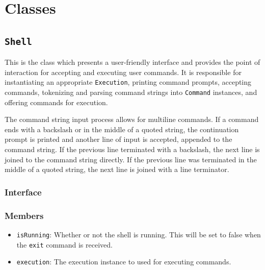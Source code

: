 \documentclass{article}
\begin{document}
  \section{Classes}

  \subsection{\texttt{Shell}}

  This is the class which presents a user-friendly interface and
  provides the point of interaction for accepting and executing user
  commands.  It is responsible for instantiating an appropriate
  \texttt{Execution}, printing command prompts, accepting commands,
  tokenizing and parsing command strings into \texttt{Command}
  instances, and offering commands for execution.

  The command string input process allows for multiline commands.  If a
  command ends with a backslash or in the middle of a quoted string, the
  continuation prompt is printed and another line of input is accepted,
  appended to the command string.  If the previous line terminated with
  a backslash, the next line is joined to the command string directly.
  If the previous line was terminated in the middle of a quoted string,
  the next line is joined with a line terminator.

  \subsubsection{Interface}
  

  \subsubsection{Members}
  \begin{itemize}
    \item \texttt{isRunning}: Whether or not the shell is running.  This
      will be set to false when the \texttt{exit} command is received.
    \item \texttt{execution}: The execution instance to used for
      executing commands.
  \end{itemize}
\end{document}
